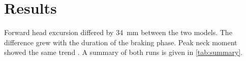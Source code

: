 
\section{Results}
\label{sec:results}

Forward head excursion differed by \SI{34}{\milli\metre} between the two models. The
difference grew with the duration of the braking phase. Peak neck moment showed the
same trend \cite{Ghost.2020}.
A summary of both runs is given in \ref{tab:summary}.
